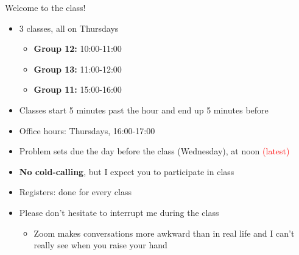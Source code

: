 \documentclass[aspectratio=169, 11pt]{beamer}
\begin{document}
\begin{frame}{Welcome to the class!}

    \begin{itemize}[<+- | alert@+>]
        \item 3 classes, all on Thursdays
        \begin{itemize}
            \item \textbf{Group 12:} 10:00-11:00
            \item \textbf{Group 13:} 11:00-12:00
            \item \textbf{Group 11:} 15:00-16:00
        \end{itemize}
        \item Classes start 5 minutes past the hour and end up 5 minutes before
        \item Office hours: Thursdays, 16:00-17:00
        \item Problem sets due the day before the class (Wednesday), at noon \textcolor{red}{(latest)}
        \item \textbf{No cold-calling}, but I expect you to participate in class
        \item Registers: done for every class
        \item Please don't hesitate to interrupt me during the class
        \begin{itemize}
            \item Zoom makes conversations more awkward than in real life and I can't really see when you raise your hand
        \end{itemize}
    \end{itemize}

\end{frame}
\end{document}
